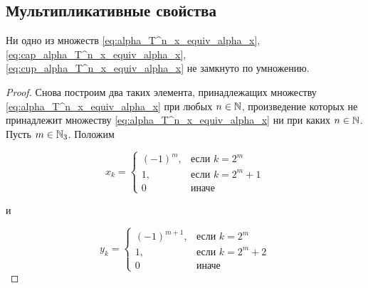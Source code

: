 \subsection{Мультипликативные свойства}

\begin{theorem}
	Ни одно из множеств
	\eqref{eq:alpha_T^n_x_equiv_alpha_x}, \eqref{eq:cap_alpha_T^n_x_equiv_alpha_x}, \eqref{eq:cup_alpha_T^n_x_equiv_alpha_x}
	не замкнуто по умножению.
\end{theorem}

\begin{proof}
	Снова построим два таких элемента, принадлежащих множеству \eqref{eq:alpha_T^n_x_equiv_alpha_x} при любых $n\in\mathbb{N}$,
	произведение которых не принадлежит множеству \eqref{eq:alpha_T^n_x_equiv_alpha_x} ни при каких $n\in\mathbb{N}$.
	Пусть $m\in\mathbb{N}_3$.
	Положим

	\begin{equation}
		x_k = \begin{cases}
			(-1)^m,  & \mbox{если } k = 2^m     \\
			1,                   & \mbox{если } k = 2^m + 1 \\
			0                    & \mbox{иначе }
		\end{cases}
	\end{equation}

	и

	\begin{equation}
		y_k = \begin{cases}
			(-1)^{m+1},  & \mbox{если } k = 2^m     \\
			1,                   & \mbox{если } k = 2^m + 2 \\
			0                    & \mbox{иначе }
		\end{cases}
	\end{equation}


\end{proof}
